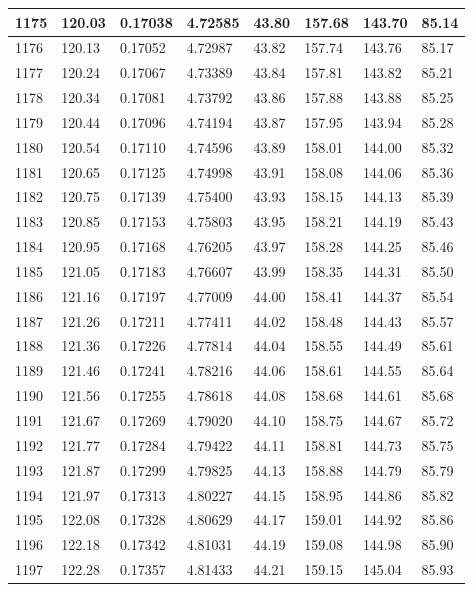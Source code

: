 \documentclass[12pt,a4paper,twoside]{article}
\begin{document}
\begin{center}
\begin{longtable}{l l l l | l l l l}
1175 & 120.03 & 0.17038 & 4.72585 & 43.80 & 157.68 & 143.70 & 85.14 \\ \hline
1176 & 120.13 & 0.17052 & 4.72987 & 43.82 & 157.74 & 143.76 & 85.17 \\ \hline
1177 & 120.24 & 0.17067 & 4.73389 & 43.84 & 157.81 & 143.82 & 85.21 \\ \hline
1178 & 120.34 & 0.17081 & 4.73792 & 43.86 & 157.88 & 143.88 & 85.25 \\ \hline
1179 & 120.44 & 0.17096 & 4.74194 & 43.87 & 157.95 & 143.94 & 85.28 \\ \hline
1180 & 120.54 & 0.17110 & 4.74596 & 43.89 & 158.01 & 144.00 & 85.32 \\ \hline
1181 & 120.65 & 0.17125 & 4.74998 & 43.91 & 158.08 & 144.06 & 85.36 \\ \hline
1182 & 120.75 & 0.17139 & 4.75400 & 43.93 & 158.15 & 144.13 & 85.39 \\ \hline
1183 & 120.85 & 0.17153 & 4.75803 & 43.95 & 158.21 & 144.19 & 85.43 \\ \hline
1184 & 120.95 & 0.17168 & 4.76205 & 43.97 & 158.28 & 144.25 & 85.46 \\ \hline
1185 & 121.05 & 0.17183 & 4.76607 & 43.99 & 158.35 & 144.31 & 85.50 \\ \hline
1186 & 121.16 & 0.17197 & 4.77009 & 44.00 & 158.41 & 144.37 & 85.54 \\ \hline
1187 & 121.26 & 0.17211 & 4.77411 & 44.02 & 158.48 & 144.43 & 85.57 \\ \hline
1188 & 121.36 & 0.17226 & 4.77814 & 44.04 & 158.55 & 144.49 & 85.61 \\ \hline
1189 & 121.46 & 0.17241 & 4.78216 & 44.06 & 158.61 & 144.55 & 85.64 \\ \hline
1190 & 121.56 & 0.17255 & 4.78618 & 44.08 & 158.68 & 144.61 & 85.68 \\ \hline
1191 & 121.67 & 0.17269 & 4.79020 & 44.10 & 158.75 & 144.67 & 85.72 \\ \hline
1192 & 121.77 & 0.17284 & 4.79422 & 44.11 & 158.81 & 144.73 & 85.75 \\ \hline
1193 & 121.87 & 0.17299 & 4.79825 & 44.13 & 158.88 & 144.79 & 85.79 \\ \hline
1194 & 121.97 & 0.17313 & 4.80227 & 44.15 & 158.95 & 144.86 & 85.82 \\ \hline
1195 & 122.08 & 0.17328 & 4.80629 & 44.17 & 159.01 & 144.92 & 85.86 \\ \hline
1196 & 122.18 & 0.17342 & 4.81031 & 44.19 & 159.08 & 144.98 & 85.90 \\ \hline
1197 & 122.28 & 0.17357 & 4.81433 & 44.21 & 159.15 & 145.04 & 85.93 \\ \hline

\end{longtable}
\end{center}
\end{document}
